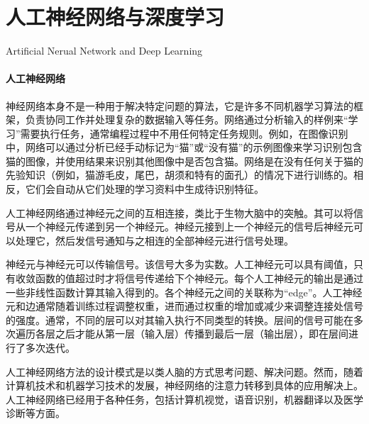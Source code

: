 \section{人工神经网络与深度学习}{Artificial Nerual Network and Deep Learning}

\paragraph{人工神经网络}\cite{ wiki:Artificial_neural_network}神经网络本身不是一种用于解决特定问题的算法，它是许多不同机器学习算法的框架，负责协同工作并处理复杂的数据输入等任务。网络通过分析输入的样例来“学习”需要执行任务，通常编程过程中不用任何特定任务规则。例如，在图像识别中，网络可以通过分析已经手动标记为“猫”或“没有猫”的示例图像来学习识别包含猫的图像，并使用结果来识别其他图像中是否包含猫。网络是在没有任何关于猫的先验知识（例如，猫游毛皮，尾巴，胡须和特有的面孔）的情况下进行训练的。相反，它们会自动从它们处理的学习资料中生成待识别特征。

人工神经网络通过神经元之间的互相连接，类比于生物大脑中的突触。其可以将信号从一个神经元传递到另一个神经元。神经元接到上一个神经元的信号后神经元可以处理它，然后发信号通知与之相连的全部神经元进行信号处理。

神经元与神经元可以传输信号。该信号大多为实数。人工神经元可以具有阈值，只有收敛函数的值超过时才将信号传递给下个神经元。每个人工神经元的输出是通过一些非线性函数计算其输入得到的。各个神经元之间的关联称为“edge”。人工神经元和边通常随着训练过程调整权重，进而通过权重的增加或减少来调整连接处信号的强度。通常，不同的层可以对其输入执行不同类型的转换。层间的信号可能在多次遍历各层之后才能从第一层（输入层）传播到最后一层（输出层），即在层间进行了多次迭代。

人工神经网络方法的设计模式是以类人脑的方式思考问题、解决问题。然而，随着计算机技术和机器学习技术的发展，神经网络的注意力转移到具体的应用解决上。人工神经网络已经用于各种任务，包括计算机视觉，语音识别，机器翻译以及医学诊断等方面。

